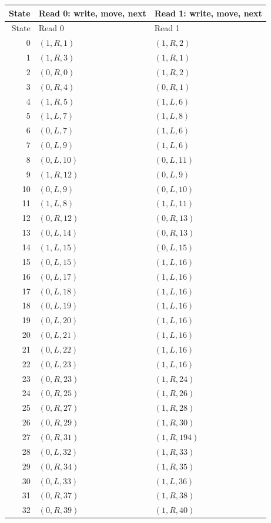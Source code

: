 \small
\begin{longtable}{rll}
\toprule
State & Read 0: write, move, next & Read 1: write, move, next\\
\midrule
\endfirsthead
\toprule State & Read 0 & Read 1\\\midrule
\endhead
0 & $(1,R,1)$ & $(1,R,2)$ \\
1 & $(1,R,3)$ & $(1,R,1)$ \\
2 & $(0,R,0)$ & $(1,R,2)$ \\
3 & $(0,R,4)$ & $(0,R,1)$ \\
4 & $(1,R,5)$ & $(1,L,6)$ \\
5 & $(1,L,7)$ & $(1,L,8)$ \\
6 & $(0,L,7)$ & $(1,L,6)$ \\
7 & $(0,L,9)$ & $(1,L,6)$ \\
8 & $(0,L,10)$ & $(0,L,11)$ \\
9 & $(1,R,12)$ & $(0,L,9)$ \\
10 & $(0,L,9)$ & $(0,L,10)$ \\
11 & $(1,L,8)$ & $(1,L,11)$ \\
12 & $(0,R,12)$ & $(0,R,13)$ \\
13 & $(0,L,14)$ & $(0,R,13)$ \\
14 & $(1,L,15)$ & $(0,L,15)$ \\
15 & $(0,L,15)$ & $(1,L,16)$ \\
16 & $(0,L,17)$ & $(1,L,16)$ \\
17 & $(0,L,18)$ & $(1,L,16)$ \\
18 & $(0,L,19)$ & $(1,L,16)$ \\
19 & $(0,L,20)$ & $(1,L,16)$ \\
20 & $(0,L,21)$ & $(1,L,16)$ \\
21 & $(0,L,22)$ & $(1,L,16)$ \\
22 & $(0,L,23)$ & $(1,L,16)$ \\
23 & $(0,R,23)$ & $(1,R,24)$ \\
24 & $(0,R,25)$ & $(1,R,26)$ \\
25 & $(0,R,27)$ & $(1,R,28)$ \\
26 & $(0,R,29)$ & $(1,R,30)$ \\
27 & $(0,R,31)$ & $(1,R,194)$ \\
28 & $(0,L,32)$ & $(1,R,33)$ \\
29 & $(0,R,34)$ & $(1,R,35)$ \\
30 & $(0,L,33)$ & $(1,L,36)$ \\
31 & $(0,R,37)$ & $(1,R,38)$ \\
32 & $(0,R,39)$ & $(1,R,40)$ \\

\end{longtable}
